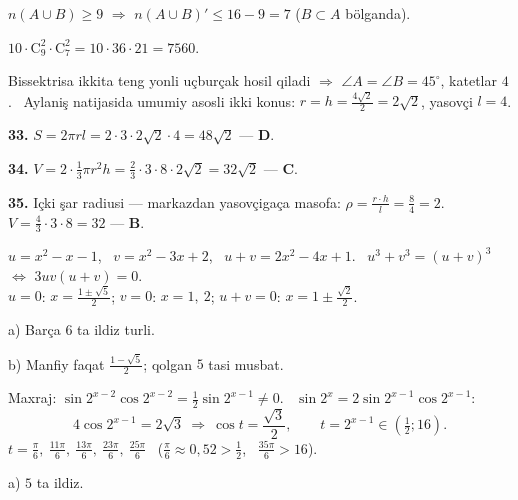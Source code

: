 $n(A\cup B)\ge9$ $\Rightarrow$ $n(A\cup B)'\le16-9=7$ ($B\subset A$ bölganda).

$10\cdot\mathrm C_9^2\cdot\mathrm C_7^2=10\cdot36\cdot21=7560$.

\newpage
{}
Bissektrisa ikkita teng yonli uçburçak hosil qiladi $\Rightarrow$ $\angle A=\angle B=45^\circ$, katetlar $4$. \ Aylaniş natijasida umumiy asosli ikki konus: $r=h=\frac{4\sqrt2}2=2\sqrt2$, yasovçi $l=4$.

\textbf{33.} $S=2\pi rl=2\cdot3\cdot2\sqrt2\cdot4=48\sqrt2$ — \textbf{D}.

\textbf{34.} $V=2\cdot\frac13\pi r^2h=\frac23\cdot3\cdot8\cdot2\sqrt2=32\sqrt2$ — \textbf{C}.

\textbf{35.} Içki şar radiusi — markazdan yasovçigaça masofa: $\rho=\frac{r\cdot h}l=\frac{8}4=2$. \ $V=\frac43\cdot3\cdot8=32$ — \textbf{B}.

\newpage
{}
$u=x^2-x-1$, \ $v=x^2-3x+2$, \ $u+v=2x^2-4x+1$. \ $u^3+v^3=(u+v)^3$ $\Leftrightarrow$ $3uv(u+v)=0$.\\
$u=0$: $x=\frac{1\pm\sqrt5}2$; \quad $v=0$: $x=1,\ 2$; \quad $u+v=0$: $x=1\pm\frac{\sqrt2}2$.

a) Barça $6$ ta ildiz turli.

b) Manfiy faqat $\frac{1-\sqrt5}2$; qolgan $5$ tasi musbat.

\newpage
{}
Maxraj: $\sin2^{x-2}\cos2^{x-2}=\frac12\sin2^{x-1}\ne0$. \ $\sin2^x=2\sin2^{x-1}\cos2^{x-1}$:
\[4\cos2^{x-1}=2\sqrt3\ \Rightarrow\ \cos t=\frac{\sqrt3}2,\qquad t=2^{x-1}\in\left(\tfrac12;16\right).\]
$t=\frac\pi6,\ \frac{11\pi}6,\ \frac{13\pi}6,\ \frac{23\pi}6,\ \frac{25\pi}6$ \ ($\frac\pi6\approx0{,}52>\frac12$, \ $\frac{35\pi}6>16$).

a) $5$ ta ildiz.

